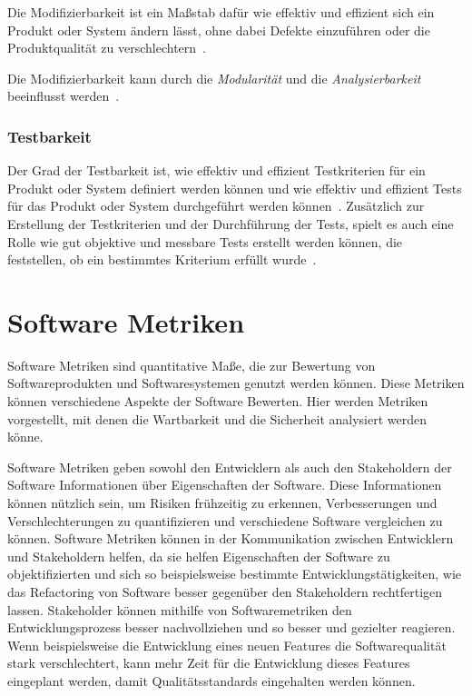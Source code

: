 \documentclass[12pt, a4paper, ngerman]{article}
\begin{document}
Die Modifizierbarkeit ist ein Maßstab dafür wie effektiv und effizient sich ein Produkt oder System
ändern lässt, ohne dabei Defekte einzuführen oder die Produktqualität zu verschlechtern~\cite{ISO25010}.

Die Modifizierbarkeit kann durch die \emph{Modularität} und die \emph{Analysierbarkeit} beeinflusst werden~\cite{ISO25010}.

\subsubsection{Testbarkeit}

Der Grad der Testbarkeit ist,
wie effektiv und effizient Testkriterien für ein Produkt oder System definiert werden können
und wie effektiv und effizient Tests für das Produkt oder System durchgeführt werden können~\cite{ISO25010}.
Zusätzlich zur Erstellung der Testkriterien und der Durchführung der Tests,
spielt es auch eine Rolle wie gut objektive und messbare Tests erstellt werden können,
die feststellen, ob ein bestimmtes Kriterium erfüllt wurde~\cite{IEEE24765}.

\section{Software Metriken}

Software Metriken sind quantitative Maße,
die zur Bewertung von Softwareprodukten und Softwaresystemen
genutzt werden können.
Diese Metriken können verschiedene Aspekte der Software Bewerten.
Hier werden Metriken vorgestellt,
mit denen die Wartbarkeit und die Sicherheit
analysiert werden könne.

Software Metriken geben sowohl den Entwicklern
als auch den Stakeholdern der Software
Informationen über Eigenschaften der Software.
Diese Informationen können nützlich sein,
um Risiken frühzeitig zu erkennen,
Verbesserungen und Verschlechterungen zu quantifizieren
und verschiedene Software vergleichen zu können.
Software Metriken können in der Kommunikation
zwischen Entwicklern und Stakeholdern helfen,
da sie helfen Eigenschaften der Software zu objektifizierten
und sich so beispielsweise bestimmte Entwicklungstätigkeiten,
wie das Refactoring von Software
besser gegenüber den Stakeholdern rechtfertigen lassen.
Stakeholder können mithilfe von Softwaremetriken
den Entwicklungsprozess besser nachvollziehen
und so besser und gezielter reagieren.
Wenn beispielsweise die Entwicklung eines neuen Features
die Softwarequalität stark verschlechtert,
kann mehr Zeit für die Entwicklung dieses Features
eingeplant werden, damit Qualitätsstandards eingehalten werden können.
\end{document}
